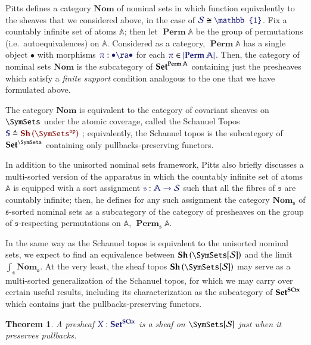 \documentclass[11pt]{article}
\newtheorem{thm}{Theorem}[section]
\theoremstyle{definition}
\theoremstyle{remark}
\numberwithin{equation}{section}
\newcommand\Sheaves[1]{\mathbf{Sh}\left(#1\right)}
\newcommand\SCtxSite{\SymSets[\Sorts]}
\DeclareMathOperator{\Perm}{\mathbf{Perm}}
\begin{document}
Pitts defines a category $\mathbf{Nom}$ of nominal sets in \cite{pitts:2013}
which function equivalently to the sheaves that we considered above, in the
case of $\IMode{\Sorts}\cong\IMode{\mathbb{1}}$. Fix a countably infinite set
of atoms $\mathbb{A}$; then let $\Perm\mathbb{A}$ be the group of permutations
(i.e.\ autoequivalences) on $\mathbb{A}$.  Considered as a category,
$\Perm\mathbb{A}$ has a single object $\bullet$ with morphisms
$\Of{\pi}{\bullet\ra\bullet}$ for each $\Member{\pi}{\Dom{\Perm\mathbb{A}}}$.
Then, the category of nominal sets $\mathbf{Nom}$ is the subcategory of
$\Sets^{\Perm\mathbb{A}}$ containing just the presheaves which satisfy a
\emph{finite support} condition analogous to the one that we have formulated
above.

The category $\mathbf{Nom}$ is equivalent to the category of covariant sheaves
on $\SymSets$ under the atomic coverage, called the Schanuel Topos
$\Define{\mathbb{S}}{\Sheaves{\OpCat{\SymSets}}}$ \cite{pitts:2013,
fiore-staton:2006}; equivalently, the Schanuel topos is the subcategory of
$\Sets^\SymSets$ containing only pullbacks-preserving functors.

In addition to the unisorted nominal sets framework, Pitts also briefly
discusses a multi-sorted version of the apparatus in which the countably
infinite set of atoms $\mathbb{A}$ is equipped with a sort assignment
$\Of{\mathfrak{s}}{\mathbb{A}\to\Sorts}$ such that all the fibres of
$\mathfrak{s}$ are countably infinite; then, he defines for any such assignment
the category $\mathbf{Nom}_\mathfrak{s}$ of $\mathfrak{s}$-sorted nominal sets
as a subcategory of the category of presheaves on the group of
$\mathfrak{s}$-respecting permutations on $\mathbb{A}$,
$\Perm_\mathfrak{s}\mathbb{A}$.

In the same way as the Schanuel topos is equivalent to the unisorted nominal
sets, we expect to find an equivalence between $\Sheaves{\SCtxSite}$ and the
limit $\int_{\mathfrak{s}}\mathbf{Nom}_\mathfrak{s}$. At the very least,
the sheaf topos $\Sheaves{\SCtxSite}$ may serve as a multi-sorted
generalization of the Schanuel topos, for which we may carry over certain
useful results, including its characterization as the subcategory of
$\mathbf{Set}^{\mathbf{SCtx}}$ which contains just the pullbacks-preserving functors.

\begin{thm}
  A presheaf $\Of{X}{\Sets^{\SCtx}}$ is a sheaf on $\SCtxSite$ just when it
  preserves pullbacks.
\end{thm}
\end{document}
